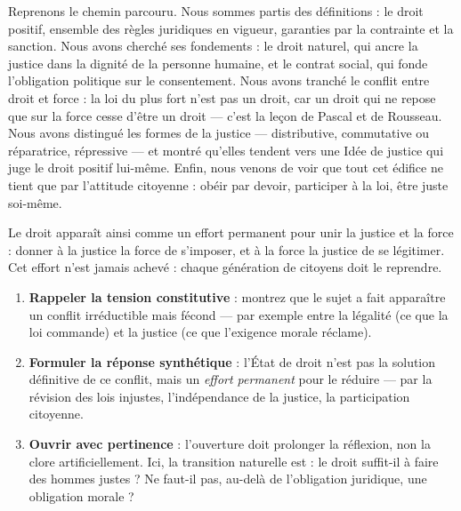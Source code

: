 \documentclass[11pt]{article}
\newcounter{popsec}
\newcounter{popsub}
\newcommand{\courssub}[1]{%
  \stepcounter{popsub}%
  \par\vspace{9pt}\noindent{\popxbold\fontsize{11.5}{13}\selectfont\color{popink}{\color{poporange}\thepopsec.\thepopsub}\hspace{6pt}#1}\par\nopagebreak\vspace{4pt}
}
\begin{document}
\courssub{Synthèse de la leçon et ouverture}

Reprenons le chemin parcouru. Nous sommes partis des définitions : le droit positif, ensemble des règles juridiques en vigueur, garanties par la contrainte et la sanction. Nous avons cherché ses fondements : le droit naturel, qui ancre la justice dans la dignité de la personne humaine, et le contrat social, qui fonde l'obligation politique sur le consentement. Nous avons tranché le conflit entre droit et force : la loi du plus fort n'est pas un droit, car un droit qui ne repose que sur la force cesse d'être un droit — c'est la leçon de Pascal et de Rousseau. Nous avons distingué les formes de la justice — distributive, commutative ou réparatrice, répressive — et montré qu'elles tendent vers une Idée de justice qui juge le droit positif lui-même. Enfin, nous venons de voir que tout cet édifice ne tient que par l'attitude citoyenne : obéir par devoir, participer à la loi, être juste soi-même.

Le droit apparaît ainsi comme un effort permanent pour unir la justice et la force : donner à la justice la force de s'imposer, et à la force la justice de se légitimer. Cet effort n'est jamais achevé : chaque génération de citoyens doit le reprendre.

\begin{methode}
\begin{enumerate}
\item \textbf{Rappeler la tension constitutive} : montrez que le sujet a fait apparaître un conflit irréductible mais fécond — par exemple entre la légalité (ce que la loi commande) et la justice (ce que l'exigence morale réclame).
\item \textbf{Formuler la réponse synthétique} : l'État de droit n'est pas la solution définitive de ce conflit, mais un \emph{effort permanent} pour le réduire — par la révision des lois injustes, l'indépendance de la justice, la participation citoyenne.
\item \textbf{Ouvrir avec pertinence} : l'ouverture doit prolonger la réflexion, non la clore artificiellement. Ici, la transition naturelle est : le droit suffit-il à faire des hommes justes ? Ne faut-il pas, au-delà de l'obligation juridique, une obligation morale ?
\end{enumerate}
\end{methode}
\end{document}

